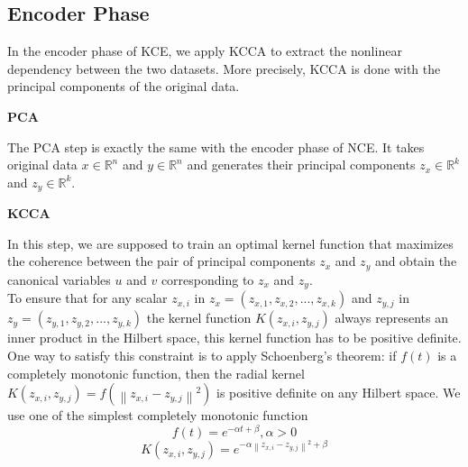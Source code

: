 \documentclass[12pt]{report} %
\newcommand{\norm}[1]{\left\lVert #1 \right\rVert}
\begin{document}
\subsection{Encoder Phase}
In the encoder phase of KCE, we apply KCCA to extract the nonlinear dependency between the two datasets. More precisely, KCCA is done with the principal components of the original data.

\textbf{PCA}

The PCA step is exactly the same with the encoder phase of NCE. It takes original data $x\in \mathbb{R}^{n}$ and $y\in \mathbb{R}^{n}$ and generates their principal components $z_x\in \mathbb{R}^{k}$ and $z_y\in \mathbb{R}^{k}$.

\textbf{KCCA}

In this step, we are supposed to train an optimal kernel function that maximizes the coherence between the pair of principal components $z_x$ and $z_y$ and obtain the canonical variables $u$ and $v$ corresponding to $z_x$ and $z_y$. \\
To ensure that for any scalar \(z_{x,i}\) in \(z_x=(z_{x,1},z_{x,2},...,z_{x,k})\) and \(z_{y,j}\) in \(z_y=(z_{y,1},z_{y,2},...,z_{y,k})\) the kernel function $K(z_{x,i},z_{y,j})$ always represents an inner product in the Hilbert space, this kernel function has to be positive definite. One way to satisfy this constraint is to apply Schoenberg's theorem: if \(f(t)\) is a completely monotonic function, then the radial kernel $K(z_{x,i},z_{y,j})=f(\norm{z_{x,i}-z_{y,j}}^2)$ is positive definite on any Hilbert space. We use one of the simplest completely monotonic function
\begin{equation}
f(t)=e^{-\alpha t + \beta}, \alpha>0
\end{equation}
\begin{equation}
K(z_{x,i},z_{y,j})=e^{-\alpha \norm{z_{x,i}-z_{y,j}}^2 + \beta}
\end{equation}
\end{document}
